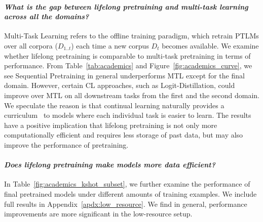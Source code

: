 \paragraph{\textit{What is the gap between lifelong pretraining and multi-task learning across all the domains?}
}
Multi-Task Learning refers to the offline training paradigm, which retrain PTLMs over all corpora ($D_{1..t}$) each time a new corpus $D_t$ becomes available. 
We examine whether lifelong pretraining is comparable to multi-task pretraining in terms of performance. From Table~\ref{tab:academics} and Figure~\ref{fig:academics_curve}, we see Sequential Pretraining in general underperforms MTL except for the final domain. However, certain CL approaches, such as Logit-Distillation, could improve over MTL on all downstream tasks from the first and the second domain. We speculate the reason is that continual learning naturally provides a curriculum~\cite{Xu2020CurriculumLF, Shi2015RecurrentNN} to models where each individual task is easier to learn. 
The results have a positive implication that lifelong pretraining is not only more computationally efficient and requires less storage of past data, but may also improve the performance of pretraining.



\paragraph{\textit{Does lifelong pretraining make models more data efficient?}}
In Table~\ref{fig:academics_kshot_subset}, we further examine the performance of final pretrained models under different amounts of training examples. We include full results in Appendix~\ref{apdx:low_resource}. We find in general, performance improvements are more significant in the low-resource setup. %




